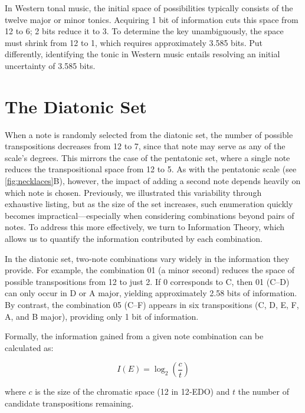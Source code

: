 \documentclass[10pt,twocolumn]{article}
\numberwithin{equation}{section} %
\begin{document}
    In Western tonal music, the initial space of possibilities typically consists of the twelve major or minor tonics.
    Acquiring 1 bit of information cuts this space from 12 to 6; 2 bits reduce it to 3.
    To determine the key unambiguously, the space must shrink from 12 to 1, which requires approximately 3.585 bits.
    Put differently, identifying the tonic in Western music entails resolving an initial uncertainty of 3.585 bits.

    \section{The Diatonic Set}

    When a note is randomly selected from the diatonic set, the number of possible transpositions decreases from 12 to 7, since that note may serve as any of the scale's degrees.
    This mirrors the case of the pentatonic set, where a single note reduces the transpositional space from 12 to 5.
    As with the pentatonic scale (see \autoref{fig:necklaces}B), however, the impact of adding a second note depends heavily on which note is chosen.
    Previously, we illustrated this variability through exhaustive listing, but as the size of the set increases, such enumeration quickly becomes impractical—especially when considering combinations beyond pairs of notes.
    To address this more effectively, we turn to Information Theory, which allows us to quantify the information contributed by each combination.

    In the diatonic set, two‑note combinations vary widely in the information they provide.
    For example, the combination 01 (a minor second) reduces the space of possible transpositions from 12 to just 2.
    If 0 corresponds to C, then 01 (C–D\text{$\flat$}) can only occur in D\text{$\flat$} or A\text{$\flat$} major, yielding approximately 2.58 bits of information.
    By contrast, the combination 05 (C–F) appears in six transpositions (C, D\text{$\flat$}, E\text{$\flat$}, F, A\text{$\flat$}, and B\text{$\flat$} major), providing only 1 bit of information.

    Formally, the information gained from a given note combination can be calculated as:

    \begin{equation}
        I(E) = \log_{2} \left( \frac{c}{t} \right)
        \label{eq:derivingSelfInformation}
    \end{equation}

    where $c$ is the size of the chromatic space (12 in 12‑EDO) and $t$ the number of candidate transpositions remaining.
\end{document}
